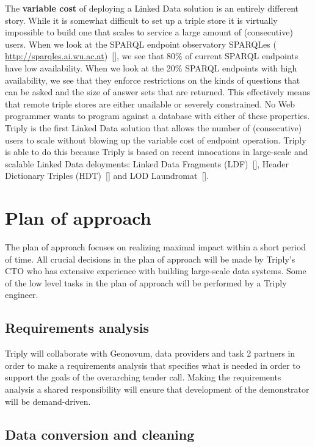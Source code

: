 \documentclass[a4paper]{scrartcl}
\begin{document}
The \textbf{variable cost} of deploying a Linked Data solution is an
entirely different story.  While it is somewhat difficult to set up a
triple store it is virtually impossible to build one that scales to
service a large amount of (consecutive) users.  When we look at the
SPARQL endpoint observatory SPARQLes ({\small
  \url{http://sparqles.ai.wu.ac.at}})~[\cite{BuildAranda2013}], we see
that 80\% of current SPARQL endpoints have low availability.  When we
look at the 20\% SPARQL endpoints with high availability, we see that
they enforce restrictions on the kinds of questions that can be asked
and the size of answer sets that are returned.  This effectively means
that remote triple stores are either unailable or severely
constrained.  No Web programmer wants to program against a database
with either of these properties.  Triply is the first Linked Data
solution that allows the number of (consecutive) users to scale
without blowing up the variable cost of endpoint operation.  Triply is
able to do this because Triply is based on recent innocations in
large-scale and scalable Linked Data deloyments: Linked Data Fragments
(LDF)~[\cite{Verborgh2014}], Header Dictionary Triples
(HDT)~[\cite{Fernandez2013}] and LOD Laundromat~[\cite{Beek2014}].

\section{Plan of approach}

The plan of approach focuses on realizing maximal impact within a
short period of time.  All crucial decisions in the plan of approach
will be made by Triply's CTO who has extensive experience with
building large-scale data systems.  Some of the low level tasks in the
plan of approach will be performed by a Triply engineer.

\subsection{Requirements analysis}

Triply will collaborate with Geonovum, data providers and task 2
partners in order to make a requirements analysis that specifies what
is needed in order to support the goals of the overarching tender
call.  Making the requirements analysis a shared responsibility will
ensure that development of the demonstrator will be demand-driven.

\subsection{Data conversion and cleaning}
\end{document}

